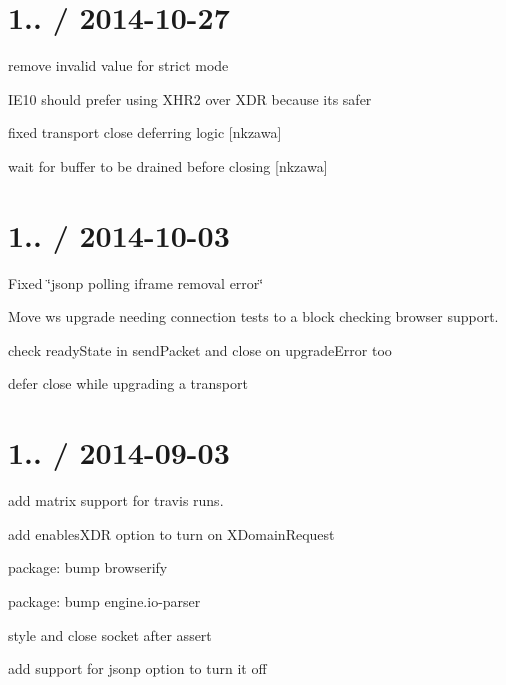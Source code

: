 \section*{1.. / 2014-\/10-\/27 }


\begin{DoxyItemize}
\item remove invalid value for strict mode
\item I\+E10 should prefer using X\+H\+R2 over X\+DR because it\textquotesingle{}s safer
\item fixed transport close deferring logic \mbox{[}nkzawa\mbox{]}
\item wait for buffer to be drained before closing \mbox{[}nkzawa\mbox{]}
\end{DoxyItemize}

\section*{1.. / 2014-\/10-\/03 }


\begin{DoxyItemize}
\item Fixed \char`\"{}jsonp polling iframe removal error\char`\"{}
\item Move ws upgrade needing connection tests to a block checking browser support.
\item check {\ttfamily ready\+State} in {\ttfamily send\+Packet} and close on {\ttfamily upgrade\+Error} too
\item defer close while upgrading a transport
\end{DoxyItemize}

\section*{1.. / 2014-\/09-\/03 }


\begin{DoxyItemize}
\item add matrix support for travis runs.
\item add {\ttfamily enables\+X\+DR} option to turn on {\ttfamily X\+Domain\+Request}
\item package\+: bump {\ttfamily browserify}
\item package\+: bump {\ttfamily engine.\+io-\/parser}
\item style and close socket after assert
\item add support for {\ttfamily jsonp} option to turn it off
\end{DoxyItemize}


